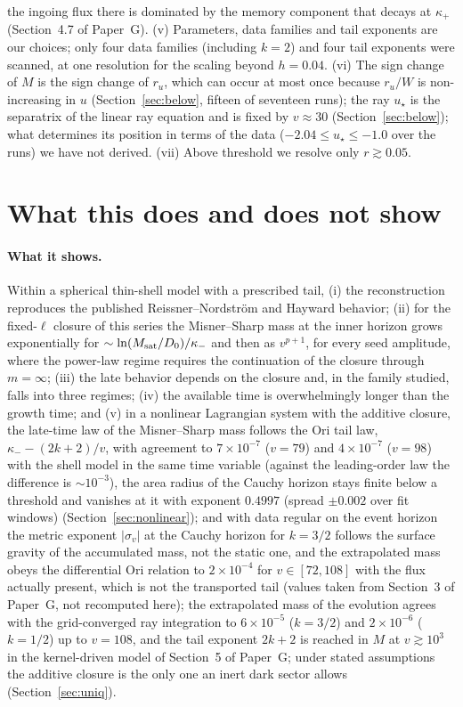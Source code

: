 \documentclass[11pt]{article}
\newcommand{\Gehdatan}{3}\newcommand{\Gkernelnum}{4}\newcommand{\Gshelln}{4.7}\newcommand{\Grayn}{5}
\begin{document}
the ingoing flux there is dominated by the memory component that decays at $\kappa_+$ (Section~\Gshelln{} of Paper~G). (v) Parameters, data families and tail exponents are our choices; only four data families (including $k=2$) and four tail exponents were scanned, at one resolution for the scaling beyond $h=0.04$. (vi) The sign change of $M$ is the sign change of $r_u$, which can occur at most once because $r_u/W$ is non-increasing in $u$ (Section~\ref{sec:below}, fifteen of seventeen runs); the ray $u_\star$ is the separatrix of the linear ray equation and is fixed by $v\approx30$ (Section~\ref{sec:below}); what determines its position in terms of the data ($-2.04\le u_\star\le-1.0$ over the runs) we have not derived. (vii) Above threshold we resolve only $r\gtrsim0.05$.

\section{What this does and does not show}
\label{sec:scope}

\paragraph{What it shows.} Within a spherical thin-shell model with a prescribed tail, (i) the reconstruction reproduces the published Reissner--Nordstr\"om and Hayward behavior; (ii) for the fixed-$\ell$ closure of this series the Misner--Sharp mass at the inner horizon grows exponentially for $\sim\ln(M_{\rm sat}/D_0)/\kappa_-$ and then as $v^{p+1}$, for every seed amplitude, where the power-law regime requires the continuation of the closure through $m=\infty$; (iii) the late behavior depends on the closure and, in the family studied, falls into three regimes; (iv) the available time is overwhelmingly longer than the growth time; and (v) in a nonlinear Lagrangian system with the additive closure, the late-time law of the Misner--Sharp mass follows the Ori tail law, $\kappa_--(2k+2)/v$, with agreement to $7\times10^{-7}$ ($v=79$) and $4\times10^{-7}$ ($v=98$) with the shell model in the same time variable (against the leading-order law the difference is $\sim10^{-3}$), the area radius of the Cauchy horizon stays finite below a threshold and vanishes at it with exponent $0.4997$ (spread $\pm0.002$ over fit windows) (Section~\ref{sec:nonlinear}); and with data regular on the event horizon the metric exponent $|\sigma_v|$ at the Cauchy horizon for $k=3/2$ follows the surface gravity of the accumulated mass, not the static one, and the extrapolated mass obeys the differential Ori relation to $2\times10^{-4}$ for $v\in[72,108]$ with the flux actually present, which is not the transported tail (values taken from Section~\Gehdatan{} of Paper~G, not recomputed here); the extrapolated mass of the evolution agrees with the grid-converged ray integration to $6\times10^{-5}$ ($k=3/2$) and $2\times10^{-6}$ ($k=1/2$) up to $v=108$, and the tail exponent $2k+2$ is reached in $M$ at $v\gtrsim10^3$ in the kernel-driven model of Section~\Grayn{} of Paper~G; under stated assumptions the additive closure is the only one an inert dark sector allows (Section~\ref{sec:uniq}).
\end{document}
